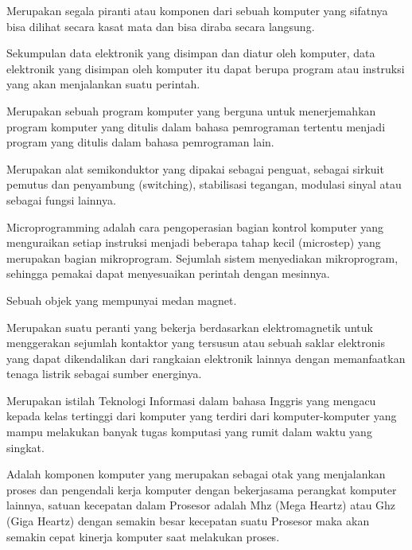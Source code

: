 
Merupakan segala piranti atau komponen dari sebuah komputer yang sifatnya bisa dilihat secara kasat mata dan bisa diraba secara langsung. 

Sekumpulan data elektronik yang disimpan dan diatur oleh komputer, data elektronik yang disimpan oleh komputer itu dapat berupa program atau instruksi yang akan menjalankan suatu perintah.

Merupakan sebuah program komputer yang berguna untuk menerjemahkan program komputer yang ditulis dalam bahasa pemrograman tertentu menjadi program yang ditulis dalam bahasa pemrograman lain.

Merupakan alat semikonduktor yang dipakai sebagai penguat, sebagai sirkuit pemutus dan penyambung (switching), stabilisasi tegangan, modulasi sinyal atau sebagai fungsi lainnya.

Microprogramming adalah cara pengoperasian bagian kontrol komputer yang menguraikan setiap instruksi menjadi beberapa tahap kecil (microstep) yang merupakan bagian mikroprogram. Sejumlah sistem menyediakan mikroprogram, sehingga pemakai dapat menyesuaikan perintah dengan mesinnya.

Sebuah objek yang mempunyai medan magnet.

Merupakan suatu peranti yang bekerja berdasarkan elektromagnetik untuk menggerakan sejumlah kontaktor yang tersusun atau sebuah saklar elektronis yang dapat dikendalikan dari rangkaian elektronik lainnya dengan memanfaatkan tenaga listrik sebagai sumber energinya.

Merupakan istilah Teknologi Informasi dalam bahasa Inggris yang mengacu kepada kelas tertinggi dari komputer yang terdiri dari komputer-komputer yang mampu melakukan banyak tugas komputasi yang rumit dalam waktu yang singkat.

Adalah komponen komputer yang merupakan sebagai otak yang menjalankan proses dan pengendali kerja komputer dengan bekerjasama perangkat komputer lainnya, satuan kecepatan dalam Prosesor adalah Mhz (Mega Heartz) atau Ghz (Giga Heartz) dengan semakin besar kecepatan suatu Prosesor maka akan semakin cepat kinerja komputer saat melakukan proses.
